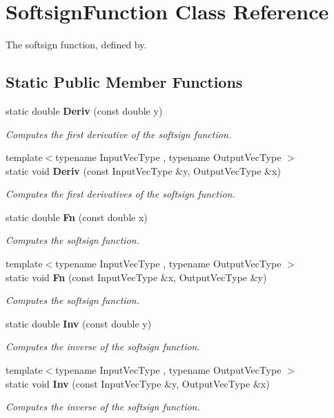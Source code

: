 \section{Softsign\+Function Class Reference}
\label{classmlpack_1_1ann_1_1SoftsignFunction}


The softsign function, defined by.  


\subsection*{Static Public Member Functions}
\begin{DoxyCompactItemize}
\item 
static double \textbf{ Deriv} (const double y)
\begin{DoxyCompactList}\small\item\em Computes the first derivative of the softsign function. \end{DoxyCompactList}\item 
{\footnotesize template$<$typename Input\+Vec\+Type , typename Output\+Vec\+Type $>$ }\\static void \textbf{ Deriv} (const Input\+Vec\+Type \&y, Output\+Vec\+Type \&x)
\begin{DoxyCompactList}\small\item\em Computes the first derivatives of the softsign function. \end{DoxyCompactList}\item 
static double \textbf{ Fn} (const double x)
\begin{DoxyCompactList}\small\item\em Computes the softsign function. \end{DoxyCompactList}\item 
{\footnotesize template$<$typename Input\+Vec\+Type , typename Output\+Vec\+Type $>$ }\\static void \textbf{ Fn} (const Input\+Vec\+Type \&x, Output\+Vec\+Type \&y)
\begin{DoxyCompactList}\small\item\em Computes the softsign function. \end{DoxyCompactList}\item 
static double \textbf{ Inv} (const double y)
\begin{DoxyCompactList}\small\item\em Computes the inverse of the softsign function. \end{DoxyCompactList}\item 
{\footnotesize template$<$typename Input\+Vec\+Type , typename Output\+Vec\+Type $>$ }\\static void \textbf{ Inv} (const Input\+Vec\+Type \&y, Output\+Vec\+Type \&x)
\begin{DoxyCompactList}\small\item\em Computes the inverse of the softsign function. \end{DoxyCompactList}\end{DoxyCompactItemize}


